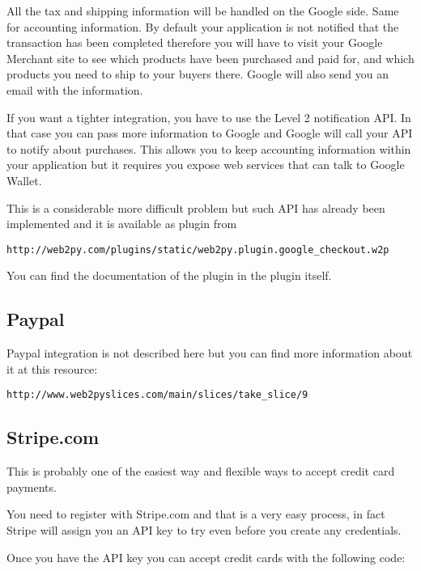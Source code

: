 \documentclass[justified,sixbynine,notoc]{tufte-book}
\begin{document}
\begin{fullwidth}
All the tax and shipping information will be handled on the Google side. Same for accounting information. By default your application is not notified that the transaction has been completed therefore you will have to visit your Google Merchant site to see which products have been purchased and paid for, and which products you need to ship to your buyers there. Google will also send you an email with the information.

If you want a tighter integration, you have to use the Level 2 notification API. In that case you can pass more information to Google and Google will call your API to notify about purchases. This allows you to keep accounting information within your application but it requires you expose web services that can talk to Google Wallet.

This is a considerable more difficult problem but such API has already been implemented and it is available as plugin from

\begin{lstlisting}[keywords={}]
http://web2py.com/plugins/static/web2py.plugin.google_checkout.w2p
\end{lstlisting}

You can find the documentation of the plugin in the plugin itself.

\goodbreak\subsection{Paypal}

Paypal integration is not described here but you can find more information about it at this resource:

\begin{lstlisting}[keywords={}]
http://www.web2pyslices.com/main/slices/take_slice/9
\end{lstlisting}

\goodbreak\subsection{Stripe.com}

This is probably one of the easiest way and flexible ways to accept credit card payments.

You need to register with Stripe.com and that is a very easy process, in fact Stripe will assign you an API key to try even before you create any credentials.

Once you have the API key you can accept credit cards with the following code:


\end{fullwidth}
\end{document}
